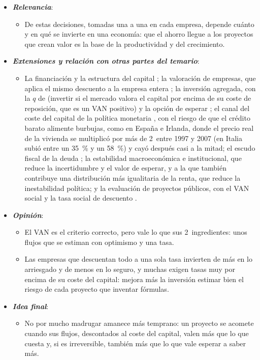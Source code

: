 \documentclass[11pt]{article}
\begin{document}
\begin{itemize}
\begin{itemize}
  \item Y la tasa no es un dato: es la rentabilidad que exigen accionistas y acreedores por el riesgo sistemático del proyecto, que resume el $\mathrm{WACC}$.
  \end{itemize}
\item \textbf{\emph{Relevancia}}:
  \begin{itemize}
  \item De estas decisiones, tomadas una a una en cada empresa, depende cuánto y en qué se invierte en una economía: que el ahorro llegue a los proyectos que crean valor es la base de la productividad y del crecimiento.
  \end{itemize}
\item \textbf{\emph{Extensiones y relación con otras partes del temario}}:
  \begin{itemize}
  \item La financiación y la estructura del capital ; la valoración de empresas, que aplica el mismo descuento a la empresa entera ; la inversión agregada, con la $q$ de  (invertir si el mercado valora el capital por encima de su coste de reposición, que es un VAN positivo) y la opción de esperar ; el canal del coste del capital de la política monetaria , con el riesgo de que el crédito barato alimente burbujas, como en España e Irlanda, donde el precio real de la vivienda se multiplicó por más de 2~entre 1997 y 2007 (en Italia subió entre un 35~\% y un 58~\%) y cayó después casi a la mitad\nocite{BIS2026Vivienda,OCDE2026Vivienda}; el escudo fiscal de la deuda ; la estabilidad macroeconómica e institucional, que reduce la incertidumbre y el valor de esperar, y a la que también contribuye una distribución más igualitaria de la renta, que reduce la inestabilidad política\nocite{AlesinaPerotti1996Income}; y la evaluación de proyectos públicos, con el VAN social y la tasa social de descuento .
  \end{itemize}
\item \textbf{\emph{Opinión}}:
  \begin{itemize}
  \item El VAN es el criterio correcto, pero vale lo que sus 2~ingredientes: unos flujos que se estiman con optimismo y una tasa.

  \item Las empresas que descuentan todo a una sola tasa invierten de más en lo arriesgado y de menos en lo seguro\nocite{KrugerLandierThesmar2015WACC}, y muchas exigen tasas muy por encima de su coste del capital\nocite{JagannathanEtAl2016Why}: mejora más la inversión estimar bien el riesgo de cada proyecto que inventar fórmulas.
  \end{itemize}
\item \textbf{\emph{Idea final}}:
  \begin{itemize}
  \item No por mucho madrugar amanece más temprano: un proyecto se acomete cuando sus flujos, descontados al coste del capital, valen más que lo que cuesta y, si es irreversible, también más que lo que vale esperar a saber más.


\end{itemize}
\end{itemize}
\end{document}
